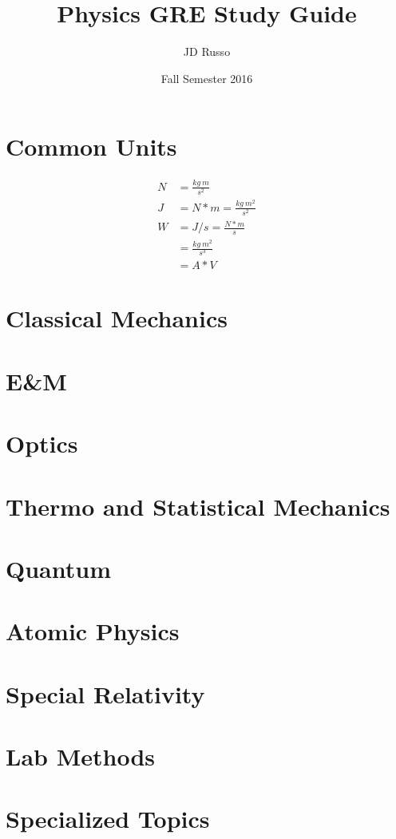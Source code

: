 \documentclass{article}      %
\title{Physics GRE Study Guide}  %
\author{JD Russo}      %
\date{Fall Semester 2016}      %
\begin{document}

\maketitle                   %


\section{Common Units}

\begin{multicols}{2}

\begin{align*}
N &= \frac{kg\:m}{s^2}  \\
J &= N * m = \frac{kg \: m^2}{s^2} \\
W &= J / s = \frac{N*m}{s}  \\ 
&= \frac{kg \: m^2}{s^3} \\
&= A*V
\end{align*}
\end{multicols}


\newpage
\section{Classical Mechanics}

\section{E\&M}

\section{Optics}

\section{Thermo and Statistical Mechanics}

\section{Quantum}

\section{Atomic Physics}

\section{Special Relativity}

\section{Lab Methods}

\section{Specialized Topics}
\end{document}
